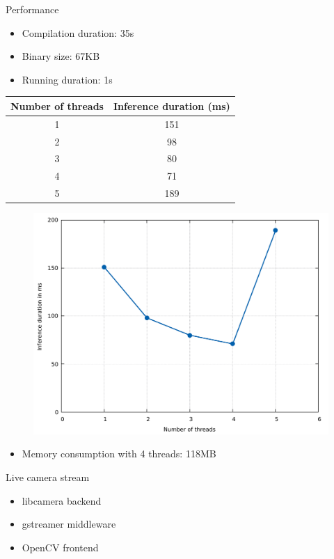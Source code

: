 \begin{frame}{Performance}
  \begin{itemize}
	\item Compilation duration: 35s
	\item Binary size: 67KB
	\item Running duration: 1s
  \end{itemize}
  \begin{table}
    {\tiny
	\begin{tabular}{|c|c|}
	  \hline
		\textbf{Number of threads} & \textbf{Inference duration (ms)} \\
	  \hline
		1 & 151 \\
	  \hline
		2 & 98 \\
	  \hline
		3 & 80 \\
	  \hline
		4 & 71 \\
	  \hline
		5 & 189 \\
	  \hline
	\end{tabular}
	}
  \end{table}
  \begin{figure}
	\includegraphics[width=\linewidth,height=0.45\textheight,keepaspectratio]{images/inference_duration_rps.pdf}
  \end{figure}
  \begin{itemize}
	\item Memory consumption with 4 threads: 118MB
  \end{itemize}

\end{frame}

\begin{frame}{Live camera stream}
  \begin{itemize}
	\item libcamera backend
	\item gstreamer middleware
	\item OpenCV frontend
  \end{itemize}
\end{frame}

